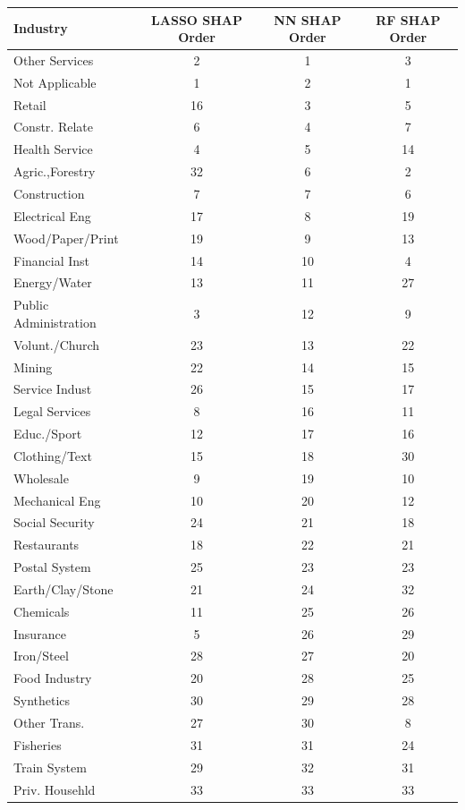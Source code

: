 \begin{tabular}{lccc}
\hline\hline
Industry & LASSO SHAP Order & NN SHAP Order & RF SHAP Order \\
\hline
Other Services&2&1&3\\
Not Applicable&1&2&1\\
Retail&16&3&5\\
Constr. Relate&6&4&7\\
Health Service&4&5&14\\
Agric.,Forestry&32&6&2\\
Construction&7&7&6\\
Electrical Eng&17&8&19\\
Wood/Paper/Print&19&9&13\\
Financial Inst&14&10&4\\
Energy/Water&13&11&27\\
Public Administration&3&12&9\\
Volunt./Church&23&13&22\\
Mining&22&14&15\\
Service Indust&26&15&17\\
Legal Services&8&16&11\\
Educ./Sport&12&17&16\\
Clothing/Text&15&18&30\\
Wholesale&9&19&10\\
Mechanical Eng&10&20&12\\
Social Security&24&21&18\\
Restaurants&18&22&21\\
Postal System&25&23&23\\
Earth/Clay/Stone&21&24&32\\
Chemicals&11&25&26\\
Insurance&5&26&29\\
Iron/Steel&28&27&20\\
Food Industry&20&28&25\\
Synthetics&30&29&28\\
Other Trans.&27&30&8\\
Fisheries&31&31&24\\
Train System&29&32&31\\
Priv. Househld&33&33&33\\
\hline\hline
\end{tabular}
